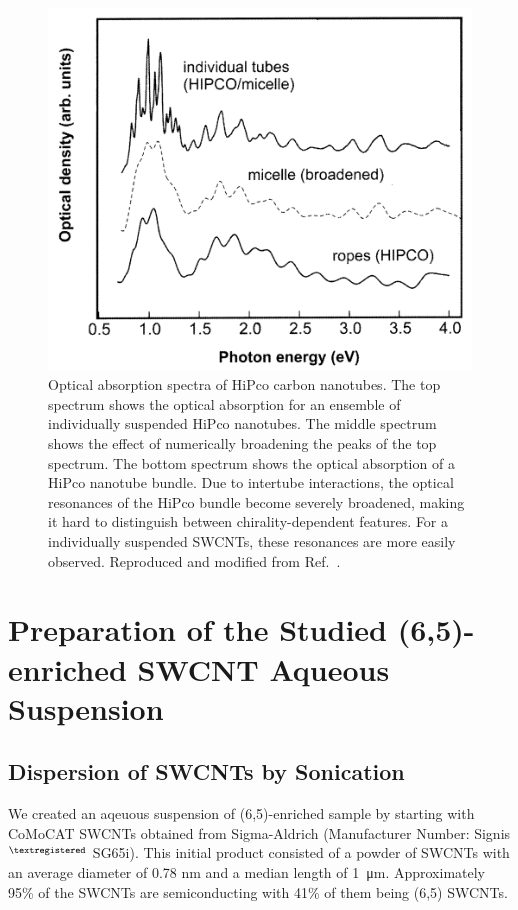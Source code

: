 \begin{figure}[H]
	\centering
	\includegraphics[scale=1.]{images/chapter_methods/cnt_rope_vs_micelle}
	\caption{Optical absorption spectra of HiPco carbon nanotubes. The top spectrum shows the optical absorption for an ensemble of individually suspended HiPco nanotubes. The middle spectrum shows the effect of numerically broadening the peaks of the top spectrum. The bottom spectrum shows the optical absorption of a HiPco nanotube bundle. Due to intertube interactions, the optical resonances of the HiPco bundle become severely broadened, making it hard to distinguish between chirality-dependent features. For a individually suspended SWCNTs, these resonances are more easily observed. Reproduced and modified from Ref.\ \cite{hagen2003quantitative}.}
	\label{fig:cnt_dispersion_vs_rope}
\end{figure}

\section{Preparation of the Studied (6,5)-enriched SWCNT Aqueous Suspension}

\subsection{Dispersion of SWCNTs by Sonication}
\label{section:dispersion_swcnt}
We created an aqeuous suspension of (6,5)-enriched sample by starting with CoMoCAT SWCNTs obtained from Sigma-Aldrich (Manufacturer Number: Signis$^{\tiny{\textregistered}}$ SG65i). This initial product consisted of a powder of SWCNTs with an average diameter of 0.78 nm and a median length of \SI{1}{\micro \meter}. Approximately 95\% of the SWCNTs are semiconducting with 41\% of them being (6,5) SWCNTs.


